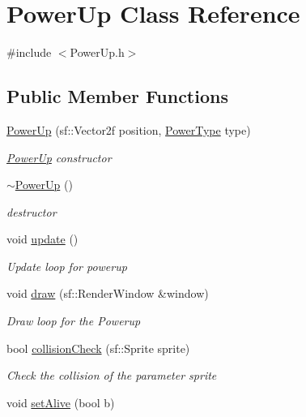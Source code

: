 \hypertarget{class_power_up}{}\section{Power\+Up Class Reference}
\label{class_power_up}


{\ttfamily \#include $<$Power\+Up.\+h$>$}

\subsection*{Public Member Functions}
\begin{DoxyCompactItemize}
\item 
\mbox{\hyperlink{class_power_up_ab2f472d987cbfb8bd72374175ed9b967}{Power\+Up}} (sf\+::\+Vector2f position, \mbox{\hyperlink{_power_up_8h_a0d0e3226055ad5266e487b58fd01cebd}{Power\+Type}} type)
\begin{DoxyCompactList}\small\item\em \mbox{\hyperlink{class_power_up}{Power\+Up}} constructor \end{DoxyCompactList}\item 
\mbox{\hyperlink{class_power_up_a353053fe27c5a148a2fcd4f5f45e19af}{$\sim$\+Power\+Up}} ()
\begin{DoxyCompactList}\small\item\em destructor \end{DoxyCompactList}\item 
void \mbox{\hyperlink{class_power_up_ab96271d08f69d68d022a758836f3c5cd}{update}} ()
\begin{DoxyCompactList}\small\item\em Update loop for powerup \end{DoxyCompactList}\item 
void \mbox{\hyperlink{class_power_up_a79c505ad6dbc8aedeadb7e77a2302503}{draw}} (sf\+::\+Render\+Window \&window)
\begin{DoxyCompactList}\small\item\em Draw loop for the Powerup \end{DoxyCompactList}\item 
bool \mbox{\hyperlink{class_power_up_ab180aaeba2853c15b12df7f0a84f9801}{collision\+Check}} (sf\+::\+Sprite sprite)
\begin{DoxyCompactList}\small\item\em Check the collision of the parameter sprite \end{DoxyCompactList}\item 
void \mbox{\hyperlink{class_power_up_a9cf6bf9fc2727b2ca534b556f2ef062f}{set\+Alive}} (bool b)

\end{DoxyCompactItemize}
